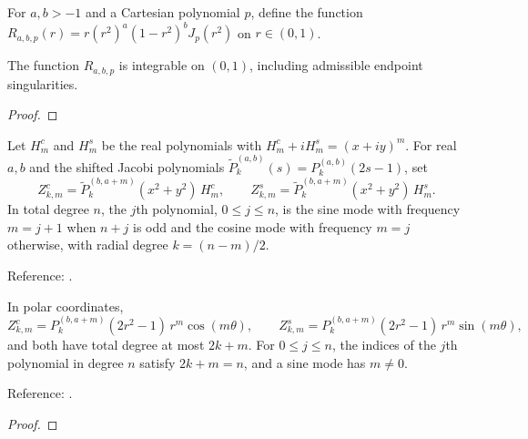 \begin{supporting}
\begin{definition}
\label{def:zernike-polar-input}
\leanok
For $a,b>-1$ and a Cartesian polynomial $p$, define the function $R_{a,b,p}(r)=r(r^2)^a(1-r^2)^bJ_p(r^2)$ on $r\in(0,1)$.
\end{definition}

\begin{theorem}
\label{thm:zernike-polar-input}
\leanok
The function $R_{a,b,p}$ is integrable on $(0,1)$, including admissible endpoint singularities.
\end{theorem}
\begin{proof}
\leanok
\end{proof}
\end{supporting}


\begin{definition}
\label{def:zernike-real}
\leanok
Let $H^c_m$ and $H^s_m$ be the real polynomials with $H^c_m+iH^s_m=(x+iy)^m$.
For real $a,b$ and the shifted Jacobi polynomials
$\widetilde P_k^{(a,b)}(s)=P_k^{(a,b)}(2s-1)$, set
\[
 Z^c_{k,m}=\widetilde P_k^{(b,a+m)}(x^2+y^2)\,H^c_m,\qquad
 Z^s_{k,m}=\widetilde P_k^{(b,a+m)}(x^2+y^2)\,H^s_m.
\]
In total degree $n$, the $j$th polynomial, $0\le j\le n$, is the sine mode with
frequency $m=j+1$ when $n+j$ is odd and the cosine mode with frequency $m=j$
otherwise, with radial degree $k=(n-m)/2$.

Reference: \cite[18.37(i)]{dlmf}.
\end{definition}

\begin{theorem}
\label{thm:zernike-real-basic}
\leanok
In polar coordinates,
\[
 Z^c_{k,m}=P_k^{(b,a+m)}(2r^2-1)\,r^m\cos(m\theta),\qquad
 Z^s_{k,m}=P_k^{(b,a+m)}(2r^2-1)\,r^m\sin(m\theta),
\]
and both have total degree at most $2k+m$. For $0\le j\le n$, the indices of the
$j$th polynomial in degree $n$ satisfy $2k+m=n$, and a sine mode has $m\ne0$.

Reference: \cite[18.37(i)]{dlmf}.
\end{theorem}
\begin{proof}
\leanok
\end{proof}

